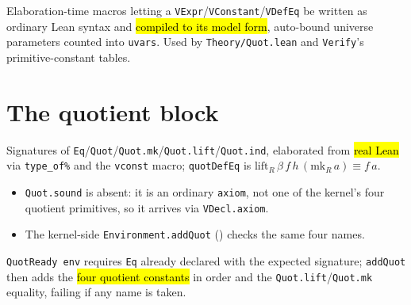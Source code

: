 \begin{definition}
\label{def:meta-macros}
\leanok
{}

 Elaboration-time macros letting a
\texttt{VExpr}/\texttt{VConstant}/\texttt{VDefEq} be written as ordinary Lean syntax and
\hl{compiled to its model form}, auto-bound universe parameters counted into
\texttt{uvars}.
Used by \texttt{Theory/Quot.lean} and \texttt{Verify}'s primitive-constant tables.
\end{definition}

\section{The quotient block}

\begin{definition}
\label{def:quot-consts}
\leanok
{}

 Signatures of
\texttt{Eq}/\texttt{Quot}/\texttt{Quot.mk}/\texttt{Quot.lift}/\texttt{Quot.ind},
elaborated from \hl{real Lean} via
\texttt{type\_of\%} and the \texttt{vconst} macro; \texttt{quotDefEq} is
$\mathrm{lift}_R\,\beta\,f\,h\,(\mathrm{mk}_R\,a) \equiv f\,a$.
\begin{itemize}
\item \texttt{Quot.sound} is absent: it is an ordinary \texttt{axiom}, not one of the
kernel's four quotient primitives, so it arrives via \texttt{VDecl.axiom}.
\item The kernel-side \texttt{Environment.addQuot} ()
checks the same four names.
\end{itemize}
\end{definition}

\begin{definition}
\label{def:venv-addquot}
\leanok
{}

 \texttt{QuotReady env} requires \texttt{Eq} already declared with the
expected signature; \texttt{addQuot} then adds the \hl{four quotient constants} in order
and the \texttt{Quot.lift}/\texttt{Quot.mk} equality, failing if any name is taken.
\end{definition}

